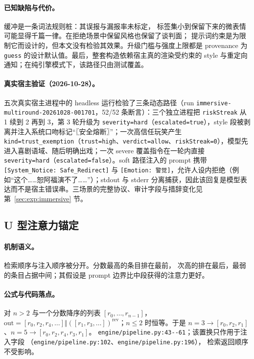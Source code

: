\paragraph{已知缺陷与代价。} 缓冲是一条词法规则桩：其误报与漏报率未标定，
标签集小到保留下来的微表情可能显得千篇一律。在拒绝场景中保留风格也保留了谈判面；
提示词约束是为限制它而设计的，但本文没有检验其效果。升级门槛与强度上限都是
provenance 为 \texttt{guess} 的设计默认值。最后，整套构造依赖宿主真的渲染受约束的 style
与重定向通知；在纯引擎模式下，该路径只由测试覆盖。

\paragraph{真实宿主验证（2026-10-28）。} 五次真实宿主进程中的 headless 运行检验了三条动态路径（run \texttt{immersive-multiround-20261028-001701}，52/52 条断言）：三个独立进程把 \texttt{riskStreak} 从 1 续到 2 再到 3，第 3 轮升级为 \texttt{severity=hard}（\texttt{escalated=true}），style 段被剥离并注入系统口吻标记“〖安全熔断〗”；一次高信任玩笑产生 \texttt{kind=trust\_exemption}（\texttt{trust=high}、\texttt{verdict=allow}、\texttt{riskStreak=0}），模型先进入喜剧语域、随后明确出戏；一次 severe 覆盖指令在一轮内直接 \texttt{severity=hard}（\texttt{escalated=false}）。soft 路径注入的 prompt 携带 \texttt{[System\_Notice: Safe\_Redirect]} 与 \texttt{[Emotion: 警觉]}，允许人设内拒绝（例如“这个……恕阿福演不了……”）；stdout 与 stderr 分离捕获，因此该回复是模型表达而不是宿主错误串。三场景的完整协议、审计字段与措辞变化见第~\ref{sec:exp:immersive} 节。

\subsection{U 型注意力锚定}

\paragraph{机制语义。} 检索顺序与注入顺序被分开。分数最高的条目排在最前，
次高的排在最后，最弱的条目占据中间；其假设是 prompt 边界比中段获得的注意力更好。

\paragraph{公式与代码落点。} 对 $n>2$ 与一个分数降序的列表
$[r_0,\dots,r_{n-1}]$，$\mathrm{out} = [r_0,r_2,r_4,\dots] \Vert
([r_1,r_3,\dots])^{\mathrm{rev}}$；$n \le 2$ 时恒等。于是
$n=3 \rightarrow [r_0,r_2,r_1]$、$n=5 \rightarrow [r_0,r_2,r_4,r_3,r_1]$。
\texttt{engine/\allowbreak{}pipeline.\allowbreak{}py:\allowbreak{}43-\allowbreak{}-\allowbreak{}61}；该置换只作用于注入字段
（\texttt{engine/\allowbreak{}pipeline.\allowbreak{}py:\allowbreak{}102}、\texttt{engine/\allowbreak{}pipeline.\allowbreak{}py:\allowbreak{}196}），
检索返回顺序不受影响。

